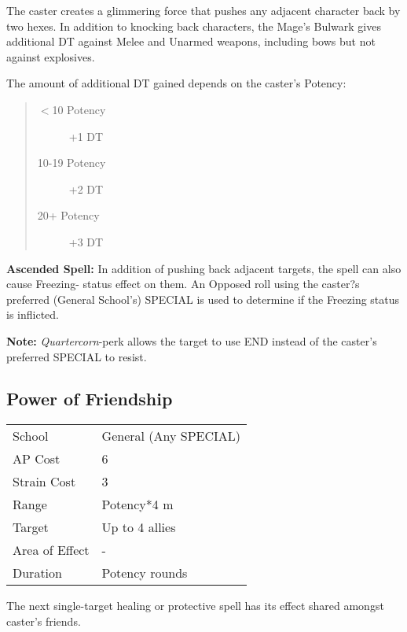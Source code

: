 \documentclass[11pt,a4paper,twocolumn]{book}
\begin{document}
\medskip

The caster creates a glimmering force that pushes any adjacent character back by two hexes. In addition to knocking back characters, the Mage's Bulwark gives additional DT against Melee and Unarmed weapons, including bows but not against explosives.

The amount of additional DT gained depends on the caster's Potency:
\begin{quote}
	\begin{description}
		\item[$<$10 Potency] 	+1 DT
		\item[10-19 Potency] 	+2 DT
		\item[20+ Potency] 		+3 DT
	\end{description}	
\end{quote}

\bigskip

\textbf{Ascended Spell:} In addition of pushing back adjacent targets, the spell can also cause Freezing- status effect on them. An Opposed roll using the caster?s preferred (General School's) SPECIAL is used to determine if the Freezing status is inflicted.

\textbf{Note:} \textit{Quartercorn}-perk allows the target to use END instead of the caster's preferred SPECIAL to resist.

\vfill

\subsection*{Power of Friendship}
{
	\begin{tabu} to 75mm{| X[l,4] | X[l,7] |}
		\hline
		School 			& General (Any SPECIAL) 	\\
		AP Cost	      	& 6 					\\
		Strain Cost     & 3 					\\
		Range     		& Potency*4 m			\\
		Target      	& Up to 4 allies		\\
		Area of Effect  & -  	 				\\
		Duration     	& Potency rounds		\\ \hline
	\end{tabu}
	
}

\medskip

The next single-target healing or protective spell has its effect shared amongst caster's friends.
\end{document}
